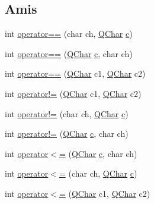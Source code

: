 \subsection*{Amis}
\begin{DoxyCompactItemize}
\item 
int \hyperlink{class_q_char_a626d918781f80dcff42d03ff6749930d}{operator==} (char ch, \hyperlink{class_q_char}{Q\+Char} \hyperlink{060__command__switch_8tcl_ab14f56bc3bd7680490ece4ad7815465f}{c})
\item 
int \hyperlink{class_q_char_a2deebc031e4e7ddaf75f71439b0ec58a}{operator==} (\hyperlink{class_q_char}{Q\+Char} \hyperlink{060__command__switch_8tcl_ab14f56bc3bd7680490ece4ad7815465f}{c}, char ch)
\item 
int \hyperlink{class_q_char_acf4eb1b3bdf933d74ba2506bac36c5a0}{operator==} (\hyperlink{class_q_char}{Q\+Char} c1, \hyperlink{class_q_char}{Q\+Char} c2)
\item 
int \hyperlink{class_q_char_a166bb280e1dab17703d96e00c39c97ab}{operator!=} (\hyperlink{class_q_char}{Q\+Char} c1, \hyperlink{class_q_char}{Q\+Char} c2)
\item 
int \hyperlink{class_q_char_a1b92f64e5743d28c56a489a5d7ad585b}{operator!=} (char ch, \hyperlink{class_q_char}{Q\+Char} \hyperlink{060__command__switch_8tcl_ab14f56bc3bd7680490ece4ad7815465f}{c})
\item 
int \hyperlink{class_q_char_adace471124ee79e40a78029bb638ae7a}{operator!=} (\hyperlink{class_q_char}{Q\+Char} \hyperlink{060__command__switch_8tcl_ab14f56bc3bd7680490ece4ad7815465f}{c}, char ch)
\item 
int \hyperlink{class_q_char_a509b164e80d1625ab984e0ed147c31c6}{operator$<$=} (\hyperlink{class_q_char}{Q\+Char} \hyperlink{060__command__switch_8tcl_ab14f56bc3bd7680490ece4ad7815465f}{c}, char ch)
\item 
int \hyperlink{class_q_char_a93bcb6e42c1ed37d592b901d55f20449}{operator$<$=} (char ch, \hyperlink{class_q_char}{Q\+Char} \hyperlink{060__command__switch_8tcl_ab14f56bc3bd7680490ece4ad7815465f}{c})
\item 
int \hyperlink{class_q_char_a9abfb242d26e415adaa25d52fd8a93fd}{operator$<$=} (\hyperlink{class_q_char}{Q\+Char} c1, \hyperlink{class_q_char}{Q\+Char} c2)
\end{DoxyCompactItemize}
